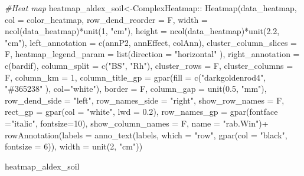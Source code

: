 \documentclass[]{interact}
\theoremstyle{plain}%
\theoremstyle{definition}
\theoremstyle{remark}
\newenvironment{Shaded}{\begin{snugshade}}{\end{snugshade}}
\newcommand{\AttributeTok}[1]{\textcolor[rgb]{0.77,0.63,0.00}{#1}}
\newcommand{\CommentTok}[1]{\textcolor[rgb]{0.56,0.35,0.01}{\textit{#1}}}
\newcommand{\DecValTok}[1]{\textcolor[rgb]{0.00,0.00,0.81}{#1}}
\newcommand{\FloatTok}[1]{\textcolor[rgb]{0.00,0.00,0.81}{#1}}
\newcommand{\FunctionTok}[1]{\textcolor[rgb]{0.00,0.00,0.00}{#1}}
\newcommand{\NormalTok}[1]{#1}
\newcommand{\OtherTok}[1]{\textcolor[rgb]{0.56,0.35,0.01}{#1}}
\newcommand{\SpecialCharTok}[1]{\textcolor[rgb]{0.00,0.00,0.00}{#1}}
\newcommand{\StringTok}[1]{\textcolor[rgb]{0.31,0.60,0.02}{#1}}
\begin{document}
\begin{Shaded}
\begin{Highlighting}[]
\CommentTok{\#Heat map}
\NormalTok{heatmap\_aldex\_soil}\OtherTok{\textless{}{-}}\NormalTok{ComplexHeatmap}\SpecialCharTok{::}  \FunctionTok{Heatmap}\NormalTok{(data\_heatmap, }\AttributeTok{col =}\NormalTok{ color\_heatmap, }
\AttributeTok{row\_dend\_reorder =}\NormalTok{ F, }\AttributeTok{width =} \FunctionTok{ncol}\NormalTok{(data\_heatmap)}\SpecialCharTok{*}\FunctionTok{unit}\NormalTok{(}\DecValTok{1}\NormalTok{, }\StringTok{"cm"}\NormalTok{),}
\AttributeTok{height =} \FunctionTok{ncol}\NormalTok{(data\_heatmap)}\SpecialCharTok{*}\FunctionTok{unit}\NormalTok{(}\FloatTok{2.2}\NormalTok{, }\StringTok{"cm"}\NormalTok{),}
\AttributeTok{left\_annotation =}  \FunctionTok{c}\NormalTok{(annP2, annEffect, colAnn),}
\AttributeTok{cluster\_column\_slices =}\NormalTok{ F,}
\AttributeTok{heatmap\_legend\_param =} \FunctionTok{list}\NormalTok{(}\AttributeTok{direction =} \StringTok{"horizontal"}\NormalTok{ ),}
\AttributeTok{right\_annotation =} \FunctionTok{c}\NormalTok{(bardif),}
\AttributeTok{column\_split =} \FunctionTok{c}\NormalTok{(}\StringTok{"BS"}\NormalTok{, }\StringTok{"Rh"}\NormalTok{),}
\AttributeTok{cluster\_rows =}\NormalTok{ F,}
\AttributeTok{cluster\_columns =}\NormalTok{ F,}
\AttributeTok{column\_km =} \DecValTok{1}\NormalTok{, }
\AttributeTok{column\_title\_gp =} \FunctionTok{gpar}\NormalTok{(}\AttributeTok{fill =} \FunctionTok{c}\NormalTok{(}\StringTok{"darkgoldenrod4"}\NormalTok{, }\StringTok{"\#365238"}\NormalTok{ ), }\AttributeTok{col=}\StringTok{"white"}\NormalTok{),}
\AttributeTok{border =}\NormalTok{ F, }\AttributeTok{column\_gap =} \FunctionTok{unit}\NormalTok{(}\FloatTok{0.5}\NormalTok{, }\StringTok{"mm"}\NormalTok{), }\AttributeTok{row\_dend\_side =} \StringTok{"left"}\NormalTok{,}
\AttributeTok{row\_names\_side =} \StringTok{"right"}\NormalTok{, }\AttributeTok{show\_row\_names =}\NormalTok{ F,}
\AttributeTok{rect\_gp =} \FunctionTok{gpar}\NormalTok{(}\AttributeTok{col =} \StringTok{"white"}\NormalTok{, }\AttributeTok{lwd =} \FloatTok{0.2}\NormalTok{), }
\AttributeTok{row\_names\_gp =} \FunctionTok{gpar}\NormalTok{(}\AttributeTok{fontface =}\StringTok{"italic"}\NormalTok{, }\AttributeTok{fontsize=}\DecValTok{10}\NormalTok{),}
\AttributeTok{show\_column\_names =}\NormalTok{ F, }\AttributeTok{name =} \StringTok{"rab.Win"}\NormalTok{)}\SpecialCharTok{+}
\FunctionTok{rowAnnotation}\NormalTok{(}\AttributeTok{labels =} \FunctionTok{anno\_text}\NormalTok{(labels, }\AttributeTok{which =} \StringTok{"row"}\NormalTok{,}
\FunctionTok{gpar}\NormalTok{(}\AttributeTok{col =} \StringTok{"black"}\NormalTok{, }\AttributeTok{fontsize =} \DecValTok{6}\NormalTok{)), }
\AttributeTok{width =} \FunctionTok{unit}\NormalTok{(}\DecValTok{2}\NormalTok{, }\StringTok{"cm"}\NormalTok{))}

\NormalTok{heatmap\_aldex\_soil}
\end{Highlighting}
\end{Shaded}
\end{document}
